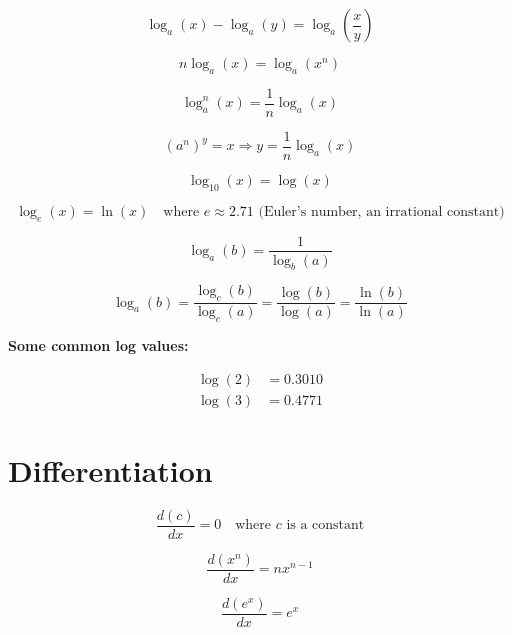 \documentclass{article}
\begin{document}
\begin{equation}
\log_a(x) - \log_a(y) = \log_a\left(\frac{x}{y}\right)
\end{equation}

\begin{equation}
n \log_a(x) = \log_a(x^n)
\end{equation}

\begin{equation}
\log_a^n(x) = \frac{1}{n} \log_a(x)
\end{equation}

\begin{equation}
(a^n)^y = x \Rightarrow y = \frac{1}{n} \log_a(x)
\end{equation}

\begin{equation}
\log_{10}(x) = \log(x)
\end{equation}

\begin{equation}
\log_{e}(x) = \ln(x) \quad \text{where } e \approx 2.71 \text{ (Euler's number, an irrational constant)}
\end{equation}

\begin{equation}
\log_a(b) = \frac{1}{\log_b(a)}
\end{equation}

\begin{equation}
\log_a(b) = \frac{\log_c(b)}{\log_c(a)} = \frac{\log(b)}{\log(a)} = \frac{\ln(b)}{\ln(a)}
\end{equation}

\textbf{Some common log values:}

\begin{align*}
\log(2) &= 0.3010 \\
\log(3) &= 0.4771
\end{align*}

\section{Differentiation}

\begin{equation}
\frac{d(c)}{dx} = 0 \quad \text{where } c \text{ is a constant}
\end{equation}

\begin{equation}
\frac{d(x^n)}{dx} = nx^{n-1}
\end{equation}

\begin{equation}
\frac{d(e^x)}{dx} = e^x
\end{equation}
\end{document}
